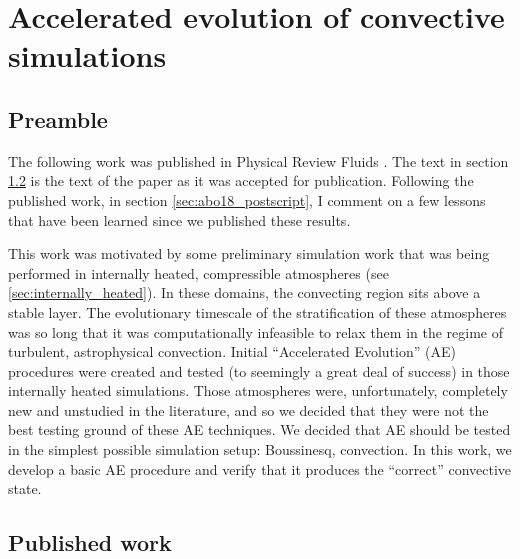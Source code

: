\chapter{Accelerated evolution of convective simulations}
\label{ch:abo18}

\section{Preamble}
The following work was published in Physical Review Fluids \citep{anders&all2018}.
The text in section \ref{sec:abo18_published} is the text of the paper as it was accepted for publication.
Following the published work, in section \ref{sec:abo18_postscript}, I comment on a few lessons that have been learned since we published these results.

This work was motivated by some preliminary simulation work that was being performed in internally heated, compressible atmospheres (see \ref{sec:internally_heated}).
In these domains, the convecting region sits above a stable layer.
The evolutionary timescale of the stratification of these atmospheres was so long that it was computationally infeasible to relax them in the regime of turbulent, astrophysical convection.
Initial ``Accelerated Evolution'' (AE) procedures were created and tested (to seemingly a great deal of success) in those internally heated simulations.
Those atmospheres were, unfortunately, completely new and unstudied in the literature, and so we decided that they were not the best testing ground of these AE techniques.
We decided that AE should be tested in the simplest possible simulation setup: Boussinesq, \RB convection.
In this work, we develop a basic AE procedure and verify that it produces the ``correct'' convective state.

\section{Published work}
\label{sec:abo18_published}

